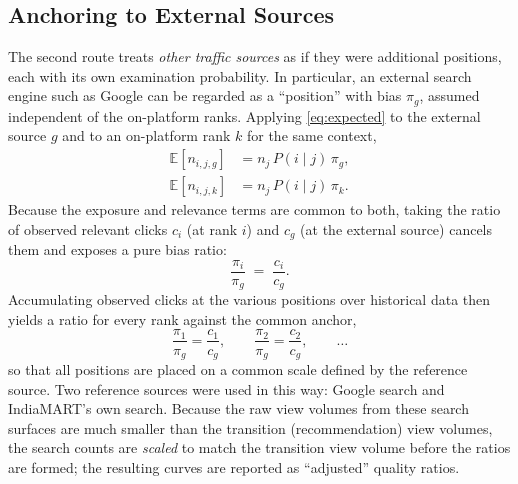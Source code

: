 \subsection{Anchoring to External Sources}
\label{sec:pb-external}
The second route treats \emph{other traffic sources} as if they were
additional positions, each with its own examination probability. In
particular, an external search engine such as Google can be regarded as a
``position'' with bias $\pi_g$, assumed independent of the on-platform ranks.
Applying \eqref{eq:expected} to the external source $g$ and to an on-platform
rank $k$ for the same context,
\begin{align}
  \mathbb{E}\!\left[n_{i,j,g}\right] &= n_j\,P(i\mid j)\,\pi_g, \label{eq:src-g}\\
  \mathbb{E}\!\left[n_{i,j,k}\right] &= n_j\,P(i\mid j)\,\pi_k. \label{eq:src-k}
\end{align}
Because the exposure and relevance terms are common to both, taking the ratio
of observed relevant clicks $c_i$ (at rank $i$) and $c_g$ (at the external
source) cancels them and exposes a pure bias ratio:
\begin{equation}
  \label{eq:ratio}
  \frac{\pi_i}{\pi_g} \;=\; \frac{c_i}{c_g}.
\end{equation}
Accumulating observed clicks at the various positions over historical data then
yields a ratio for every rank against the common anchor,
\begin{equation}
  \label{eq:hist-ratios}
  \frac{\pi_1}{\pi_g} = \frac{c_1}{c_g}, \qquad
  \frac{\pi_2}{\pi_g} = \frac{c_2}{c_g}, \qquad \dots
\end{equation}
so that all positions are placed on a common scale defined by the reference
source. Two reference sources were used in this way: Google search and
IndiaMART's own search. Because the raw view volumes from these search surfaces
are much smaller than the transition (recommendation) view volumes, the search
counts are \emph{scaled} to match the transition view volume before the ratios
are formed; the resulting curves are reported as ``adjusted'' quality ratios.

